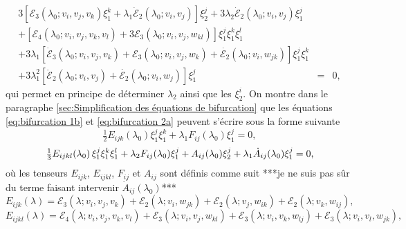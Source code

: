 \documentclass{article}
\begin{document}
\begin{eqnarray}
  3 [\mathcal{E}_3 (\lambda_0 ; v_i, v_j, v_k) \xi_1^k + \lambda_1
  \dot{\mathcal{E}}_2 (\lambda_0 ; v_i, v_j)] \xi_2^j + 3 \lambda_2
  \dot{\mathcal{E}}_2 (\lambda_0 ; v_i, v_j) \xi_1^j &  &  \nonumber\\
  + [\mathcal{E}_4 (\lambda_0 ; v_i, v_j, v_k, v_l) + 3\mathcal{E}_3
  (\lambda_0 ; v_i, v_j, w_{k  l})] \xi_1^j \xi_1^k \xi_1^l &  &
  \nonumber\\
  + 3 \lambda_1  [\dot{\mathcal{E}}_3 (\lambda_0 ; v_i, v_j, v_k)
  +\mathcal{E}_3 (\lambda_0 ; v_i, v_j, w_k) + \dot{\mathcal{E}_2} (\lambda_0
  ; v_i, w_{j  k})] \xi_1^j \xi_1^k &  &  \nonumber\\
  + 3 \lambda_1^2  [\ddot{\mathcal{E}}_2 (\lambda_0 ; v_i, v_j) +
  \dot{\mathcal{E}_2} (\lambda_0 ; v_i, w_j)] \xi_1^j & = & 0,
  \label{eq:bifurcation 2a}
\end{eqnarray}
qui permet en principe de déterminer $\lambda_2$ ainsi que les $\xi_2^i$.
On montre dans le paragraphe \ref{sec:Simplification des équations de
bifurcation} que les équations \eqref{eq:bifurcation 1b} et
\eqref{eq:bifurcation 2a} peuvent s'écrire sous la forme suivante
\begin{equation}
  \label{eq:bifurcation 1c} \tfrac{1}{2} E_{i  j  k}
  (\lambda_0) \xi_1^j \xi_1^k + \lambda_1 F_{i  j} (\lambda_0) \xi_1^j
  = 0,
\end{equation}
\begin{equation}
  \label{eq:bifurcation 2b} \tfrac{1}{3} E_{i  j  k
  l} (\lambda_0)  \hspace{0.17em} \xi_1^j \xi_1^k \xi_1^l + \lambda_2 F_{i
   j} (\lambda_0) \xi_1^j + A_{i  j} (\lambda_0) \xi_2^j +
  \lambda_1  \dot{A}_{i  j} (\lambda_0) \xi_1^j = 0,
\end{equation}
où les tenseurs $E_{i  j  k}$, $E_{i  j  k
 l}$, $F_{i  j}$ et $A_{i  j}$ sont définis comme
suit ***je ne suis pas sûr du terme faisant intervenir $\dot{A}_{i
 j} (\lambda_0)$***
\begin{equation}
  \label{eq:def Eijk} E_{i  j  k} (\lambda) =\mathcal{E}_3
  (\lambda ; v_i, v_j, v_k) +\mathcal{E}_2 (\lambda  ; v_i, w_{j  k})
  +\mathcal{E}_2 (\lambda ; v_j, w_{i  k}) +\mathcal{E}_2 (\lambda ;
  v_k, w_{i  j}),
\end{equation}
\begin{equation}
  \label{eq:def Eijkl} E_{i  j  k  l} (\lambda)
  =\mathcal{E}_4 (\lambda  ; v_i, v_j, v_k, v_l) +\mathcal{E}_3 (\lambda ;
  v_i, v_j, w_{k  l}) +\mathcal{E}_3 (\lambda ; v_i, v_k, w_{l
   j}) +\mathcal{E}_3 (\lambda ; v_i, v_l, w_{j  k}),
\end{equation}
\end{document}
